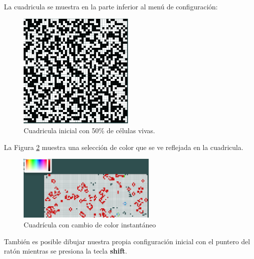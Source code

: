 La cuadricula se muestra en la parte inferior al menú de configuración:
\begin{figure}[h]
	\centering
	\includegraphics[width=0.5\textwidth]{capitulo2/images/01_grid.png}
	\caption{Cuadricula inicial con 50\% de células vivas.}
	\label{fig:01_grid}
\end{figure}

\newpage
La Figura \ref{fig:03_grid} muestra una selección de color que se ve reflejada en la cuadricula.
\begin{figure}[h]
	\centering
	\includegraphics[width=0.6\textwidth]{capitulo2/images/03_grid.png}
	\caption{Cuadrícula con cambio de color instantáneo}
	\label{fig:03_grid}
\end{figure}
\newpage
También es posible dibujar nuestra propia configuración inicial con el puntero del ratón mientras se presiona la tecla \textbf{shift}.

